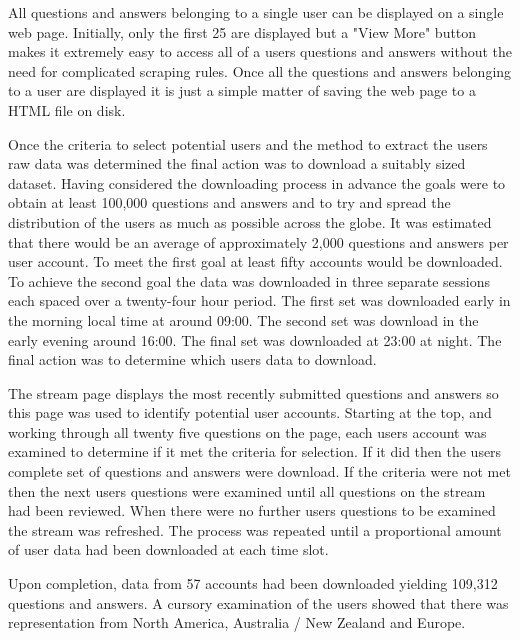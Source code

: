 All questions and answers belonging to a single user can be displayed on a single web page. Initially, only the first 25 are displayed but a "View More" button makes it extremely easy to access all of a users questions and answers without the need for complicated scraping rules. Once all the questions and answers belonging to a user are displayed it is just a simple matter of saving the web page to a HTML file on disk.

Once the criteria to select potential users and the method to extract the users raw data was determined the final action was to download a suitably sized dataset. Having considered the downloading process in advance the goals were to obtain at least 100,000 questions and answers and to try and spread the distribution of the users as much as possible across the globe.  It was estimated that there would be an average of approximately 2,000 questions and answers per user account. To meet the first goal at least fifty accounts would be downloaded. To achieve the second goal the data was downloaded in three separate sessions each spaced over a twenty-four hour period. The first set was downloaded early in the morning local time at around 09:00. The second set was download in the early evening around 16:00. The final set was downloaded at 23:00 at night. The final action was to determine which users data to download. 

The stream page displays the most recently submitted questions and answers so this page was used to identify potential user accounts. Starting at the top, and working through all twenty five questions on the page, each users account was examined to determine if it met the criteria for selection. If it did then the users complete set of questions and answers were download. If the criteria were not met then the next users questions were examined until all questions on the stream had been reviewed. When there were no further users questions to be examined the stream was refreshed. The process was repeated until a proportional amount of user data had been downloaded at each time slot.

Upon completion, data from 57 accounts had been downloaded yielding 109,312 questions and answers. A cursory examination of the users showed that there was representation from North America, Australia / New Zealand and Europe.